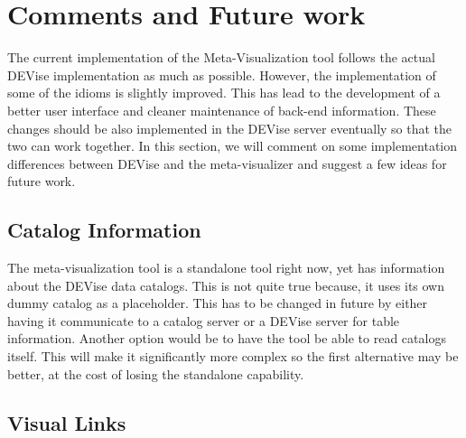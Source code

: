 \section{Comments and Future work}
\label{sec:future}

The current implementation of the Meta-Visualization tool follows the
actual DEVise implementation as much as possible. However, the implementation
of some of the idioms is slightly improved. This has lead to the development 
of a better user interface and cleaner maintenance of back-end information.
These changes should be also implemented in the DEVise server eventually 
so that the two can work together. In this section, we will comment on some
implementation differences between DEVise and the meta-visualizer and 
suggest a few ideas for future work.

\subsection{Catalog Information}

The meta-visualization tool is a standalone tool right now, yet has
information about the DEVise data catalogs. This is not quite true because,
it uses its own dummy catalog as a placeholder. This has to be changed
in future by either having it communicate to a catalog server or a DEVise
server for table information. Another option would be to have the tool
be able to read catalogs itself. This will make it significantly more
complex so the first alternative may be better, at the cost of losing 
the standalone capability.

\subsection{Visual Links}

